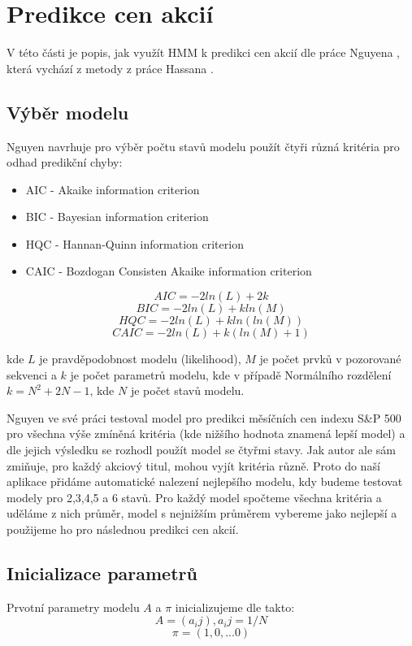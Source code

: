 \section{Predikce cen akcií}

V této části je popis, jak využít HMM k predikci cen akcií dle práce Nguyena \cite{Nguyen}, která vychází z metody z práce Hassana \cite{Hassan}.

\subsection{Výběr modelu}
Nguyen navrhuje pro výběr počtu stavů modelu použít čtyři různá kritéria pro odhad predikční chyby:
\begin{itemize}
    \item AIC - Akaike information criterion
    \item BIC - Bayesian information criterion
    \item HQC - Hannan-Quinn information criterion
    \item CAIC - Bozdogan Consisten Akaike information criterion
\end{itemize}

\[ AIC = -2ln(L) + 2k \]
\[ BIC = -2ln(L) + kln(M) \]
\[ HQC = -2ln(L) + kln(ln(M)) \]
\[ CAIC = -2ln(L) + k(ln(M) + 1) \]

kde \(L\) je pravděpodobnost modelu (likelihood), \(M\) je počet prvků v pozorované sekvenci a \(k\) je počet parametrů modelu, kde v případě Normálního rozdělení \(k = N^2 + 2N - 1\), kde \(N\) je počet stavů modelu.

Nguyen ve své práci testoval model pro predikci měsíčních cen indexu S\&P 500 pro všechna výše zmíněná kritéria (kde nižšího hodnota znamená lepší model) a dle jejich výsledku se rozhodl použít model se čtyřmi stavy. Jak autor ale sám zmiňuje, pro každý akciový titul, mohou vyjít kritéria různě. Proto do naší aplikace přidáme automatické nalezení nejlepšího modelu, kdy budeme testovat modely pro 2,3,4,5 a 6 stavů. Pro každý model spočteme všechna kritéria a uděláme z nich průměr, model s nejnižším průměrem vybereme jako nejlepší a použijeme ho pro následnou predikci cen akcií.

\subsection{Inicializace parametrů}
Prvotní parametry modelu \(A\) a \(\pi\) inicializujeme dle \cite{Nguyen} takto:
\[ A = (a_ij), a_ij = 1/N \]
\[ \pi = (1,0,...0) \]

